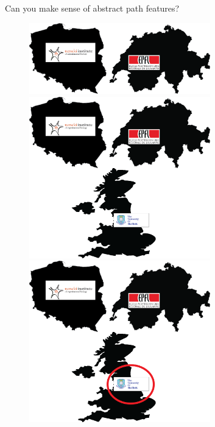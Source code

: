 \documentclass{beamer}
\begin{document}
{\begin{frame}{Can you make sense of abstract path features?}
	\begin{figure}
		\begin{overprint}
			\centerline{\includegraphics[width=0.7\textwidth]{figures/countries}}
			\centerline{\includegraphics[width=0.7\textwidth]{figures/countries2}}
			\centerline{\includegraphics[width=0.7\textwidth]{figures/countries3}}			
		\end{overprint}
	\end{figure}		
\end{frame}

}
\end{document}

